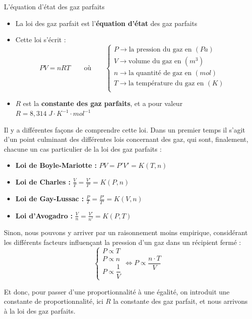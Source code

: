 \documentclass[11pt,a4paper]{article}
\begin{document}
\begin{defn}{L'équation d'état des gaz parfaits}
\begin{itemize}
    \item La loi des gaz parfait est l'\textbf{équation d'état} des gaz parfaits
    \item Cette loi s'écrit : 
    \[  PV = nRT \quad \quad \text{où}\quad \quad 
    \begin{cases}
    P \rightarrow \text{la pression du gaz en }(Pa) \\
    V \rightarrow \text{volume du gaz en }(m^3) \\ 
    n \rightarrow \text{la quantité de gaz en }(mol) \\
    T \rightarrow \text{la température du gaz en }(K) \\
    \end{cases}
    \]
    \item $R$ est la \textbf{constante des gaz parfaits}, et a pour valeur $R = 8,314\;J\cdot K^{-1}\cdot mol^{-1}$
\end{itemize}
\end{defn}
Il y a différentes façons de comprendre cette loi. Dans un premier temps il s'agit d'un point culminant des différentes lois concernant des gaz, qui sont, finalement, chacune un cas particulier de la loi des gaz parfaits : 
\begin{itemize}
    \item \textbf{Loi de Boyle-Mariotte : } $PV = P'V' = K(T,n) $ 
    \item \textbf{Loi de Charles : }  $\frac{V}{T}=\frac{V'}{T'} = K(P,n) $
    \item \textbf{Loi de Gay-Lussac : } $\frac{P}{T}=\frac{P'}{T'} = K(V,n) $
    \item \textbf{Loi d'Avogadro :} $\frac{V}{n}=\frac{V'}{n'} = K(P,T) $
\end{itemize}

Sinon, nous pouvons y arriver par un raisonnement moins empirique, considérant les différents facteurs influençant la pression d'un gaz dans un récipient fermé : 
\[ 
\begin{cases}
     P\propto T \\
     P \propto n \\ 
     P \propto \dfrac{1}{V}
\end{cases}
\Leftrightarrow
     P\propto \dfrac{n\cdot T}{V}
\]

Et donc, pour passer d'une proportionnalité à une égalité, on introduit une constante de proportionnalité, ici $ R $ la constante des gaz parfait, et nous arrivons à la loi des gaz parfaits. 
\end{document}
